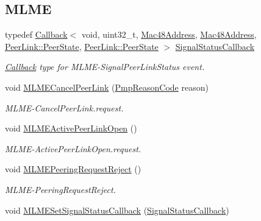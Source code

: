 \subsection*{M\+L\+ME}
\begin{DoxyCompactItemize}
\item 
typedef \hyperlink{classns3_1_1Callback}{Callback}$<$ void, uint32\+\_\+t, \hyperlink{classns3_1_1Mac48Address}{Mac48\+Address}, \hyperlink{classns3_1_1Mac48Address}{Mac48\+Address}, \hyperlink{classns3_1_1dot11s_1_1PeerLink_a432024c7d584aebae1ee15aa88ffb06d}{Peer\+Link\+::\+Peer\+State}, \hyperlink{classns3_1_1dot11s_1_1PeerLink_a432024c7d584aebae1ee15aa88ffb06d}{Peer\+Link\+::\+Peer\+State} $>$ \hyperlink{classns3_1_1dot11s_1_1PeerLink_a21075852eb44ac64164a4c977262bf9f}{Signal\+Status\+Callback}
\begin{DoxyCompactList}\small\item\em \hyperlink{classns3_1_1Callback}{Callback} type for M\+L\+M\+E-\/\+Signal\+Peer\+Link\+Status event. \end{DoxyCompactList}\item 
void \hyperlink{classns3_1_1dot11s_1_1PeerLink_a71779c31a14f73f2d464d9345cbd4d8c}{M\+L\+M\+E\+Cancel\+Peer\+Link} (\hyperlink{group__dot11s_ga1132ec5975c87960ceb86ea54481aba6}{Pmp\+Reason\+Code} reason)
\begin{DoxyCompactList}\small\item\em M\+L\+M\+E-\/\+Cancel\+Peer\+Link.\+request. \end{DoxyCompactList}\item 
void \hyperlink{classns3_1_1dot11s_1_1PeerLink_a11876ce24c46d3c6ae49d79aa96b4677}{M\+L\+M\+E\+Active\+Peer\+Link\+Open} ()
\begin{DoxyCompactList}\small\item\em M\+L\+M\+E-\/\+Active\+Peer\+Link\+Open.\+request. \end{DoxyCompactList}\item 
void \hyperlink{classns3_1_1dot11s_1_1PeerLink_a6f1d4e6ace9f5a3538a42f86ef82dd50}{M\+L\+M\+E\+Peering\+Request\+Reject} ()
\begin{DoxyCompactList}\small\item\em M\+L\+M\+E-\/\+Peering\+Request\+Reject. \end{DoxyCompactList}\item 
void \hyperlink{classns3_1_1dot11s_1_1PeerLink_a8013ffab0bc39c49677d58d9d503c331}{M\+L\+M\+E\+Set\+Signal\+Status\+Callback} (\hyperlink{classns3_1_1dot11s_1_1PeerLink_a21075852eb44ac64164a4c977262bf9f}{Signal\+Status\+Callback})

\end{DoxyCompactItemize}
